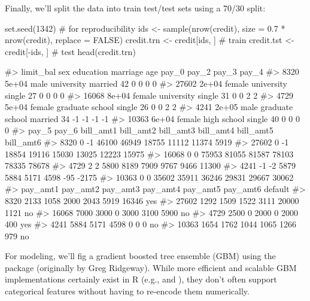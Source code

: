 Finally, we'll split the data into train test/test sets using a 70/30
split:

\begin{Schunk}
\begin{Sinput}
set.seed(1342)  # for reproducibility
ids <- sample(nrow(credit), size = 0.7 * nrow(credit), replace = FALSE)
credit.trn <- credit[ids, ]  # train
credit.tst <- credit[-ids, ]  # test
head(credit.trn)
\end{Sinput}
\begin{Soutput}
#>       limit_bal    sex       education marriage age pay_0 pay_2 pay_3 pay_4
#> 8320      5e+04   male      university  married  42     0     0     0     0
#> 27602     2e+04 female      university   single  27     0     0     0     0
#> 16068     8e+04 female      university   single  31     0     0     2     2
#> 4729      5e+04 female graduate school   single  26     0     0     2     2
#> 4241      2e+05   male graduate school  married  34    -1    -1    -1    -1
#> 10363     6e+04 female     high school   single  40     0     0     0     0
#>       pay_5 pay_6 bill_amt1 bill_amt2 bill_amt3 bill_amt4 bill_amt5 bill_amt6
#> 8320      0    -1     46100     46949     18755     11112     11374      5919
#> 27602     0    -1     18854     19116     15030     13025     12223     15975
#> 16068     0     0     75953     81055     81587     78103     78335     78678
#> 4729      2     2      5800      8189      7909      9767      9466     11300
#> 4241     -1    -2      5879      5884      5171      4598       -95     -2175
#> 10363     0     0     35602     35911     36246     29831     29667     30062
#>       pay_amt1 pay_amt2 pay_amt3 pay_amt4 pay_amt5 pay_amt6 default
#> 8320      2133     1058     2000     2043     5919    16346     yes
#> 27602     1292     1509     1522     3111    20000     1121      no
#> 16068     7000     3000        0     3000     3100     5900      no
#> 4729      2500        0     2000        0     2000      400     yes
#> 4241      5884     5171     4598        0        0        0      no
#> 10363     1654     1762     1044     1065     1266      979      no
\end{Soutput}
\end{Schunk}

For modeling, we'll fig a gradient boosted tree ensemble (GBM) using the
 package (originally by Greg Ridgeway). While more
efficient and scalable GBM implementations certainly exist in R (e.g.,
 and ), they don't often support categorical
features without having to re-encode them numerically.

